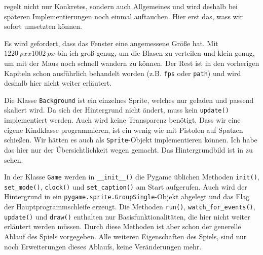  regelt nicht nur Konkretes, sondern auch Allgemeines und wird deshalb bei späteren Implementierungen noch einmal auftauchen. Hier erst das, wass wir sofort umsetzten können.


Es wird gefordert, dass das Fenster eine angemessene Größe hat. Mit $1220~pxx1002~px$ bin ich groß genug, um die Blasen zu verteilen und klein genug, um mit der Maus noch schnell wandern zu können. Der Rest ist in den vorherigen Kapiteln schon ausführlich behandelt worden (z.B. \texttt{fps} oder \texttt{path}) und wird deshalb hier nicht weiter erläutert.


Die Klasse \texttt{Background} ist ein einzelnes Sprite, welches nur geladen und passend skaliert wird. Da sich der Hintergrund nicht ändert, muss kein \texttt{update()} implementiert werden. Auch wird keine Transparenz benötigt. Dass wir eine eigene Kindklasse programmieren, ist ein wenig wie mit Pistolen auf Spatzen schießen. Wir hätten es auch als \texttt{Sprite}-Objekt implementieren können. Ich habe das hier nur der Übersichtlichkeit wegen gemacht. Das Hintergrundbild ist in  zu sehen.


In der Klasse \texttt{Game} werden in \texttt{\_\_init\_\_()} die Pygame üblichen Methoden \texttt{init()}, \texttt{set\_mode()}, \texttt{clock()} und \texttt{set\_caption()} am Start aufgerufen. Auch wird der Hintergrund in ein \texttt{pygame.sprite.GroupSingle}-Objekt abgelegt und das Flag der Hauptprogrammschleife erzeugt. Die Methoden \texttt{run()}, \texttt{watch\_for\_events()}, \texttt{update()} und \texttt{draw()} enthalten nur Basisfunktionalitäten, die hier nicht weiter erläutert werden müssen. Durch diese Methoden ist aber schon der generelle Ablauf des Spiels vorgegeben. Alle weiteren Eigenschaften des Spiels, sind nur noch Erweiterungen dieses Ablaufs, keine Veränderungen mehr. 

